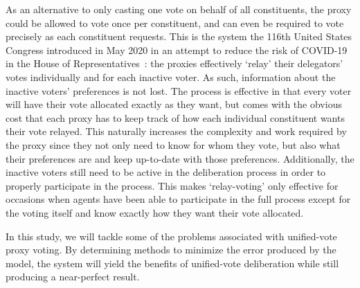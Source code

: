 As an alternative to only casting one vote on behalf of all constituents, the proxy
could be allowed to vote once per constituent, and can even be required to vote
precisely as each constituent requests.
This is the system the 116th United States Congress introduced in May 2020 in an
attempt to reduce the risk of COVID-19 in the House of
Representatives~\cite{CERP2020, Congress.gov2020}: the proxies effectively `relay' their
delegators' votes individually and for each inactive voter.
As such, information about the inactive voters' preferences is not lost.
The process is effective in that every voter will have their vote allocated exactly
as they want, but comes with the obvious cost that each proxy has to keep track
of how each individual constituent wants their vote relayed.
This naturally increases the complexity and work required by the proxy since they not
only need to know for whom they vote, but also what their preferences are and keep
up-to-date with those preferences.
Additionally, the inactive voters still need to be active in the deliberation process
in order to properly participate in the process.
This makes `relay-voting' only effective for occasions when agents have been able to
participate in the full process except for the voting itself and know exactly how
they want their vote allocated.

In this study, we will tackle some of the problems associated with unified-vote proxy
voting.
By determining methods to minimize the error produced by the model, the system will
yield the benefits of unified-vote deliberation while still producing a near-perfect
result.
